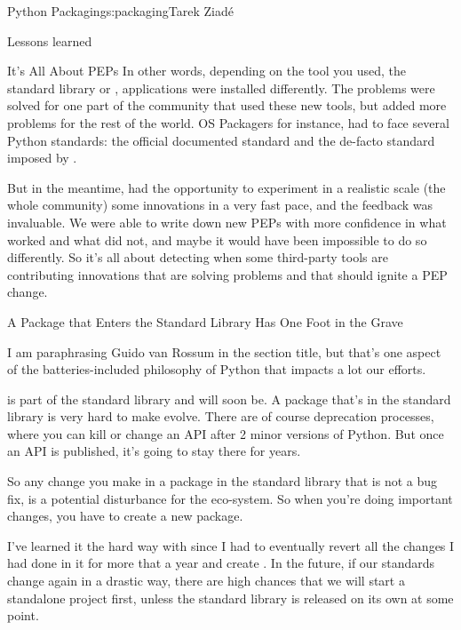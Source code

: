 \begin{aosachapter}{Python Packaging}{s:packaging}{Tarek Ziad\'{e}}
\begin{aosasect1}{Lessons learned}
\begin{aosasect2}{It's All About PEPs}
In other words, depending on the tool you used, the standard library
 or , applications were installed
differently. The problems were solved for one part of the community 
that used these new tools, but added more problems for the rest of 
the world.
OS Packagers for instance, had to face several Python standards:
the official documented standard and the de-facto standard imposed by 
.

But in the meantime,  had the opportunity to experiment
in a realistic scale (the whole community) some innovations in a
very fast pace, and the feedback was invaluable. We were able to 
write down new PEPs with more confidence in what worked and what did not,
and maybe it would have been impossible to do so differently.
So it's all about detecting when some third-party tools are contributing
innovations that are solving problems and that should ignite a PEP
change.

\end{aosasect2}

\begin{aosasect2}{A Package that Enters the Standard Library Has One Foot in the Grave}

I am paraphrasing Guido van Rossum in the section title, but that's
one aspect of the batteries-included philosophy of Python that 
impacts a lot our efforts.

 is part of the standard library and  
will soon be. A package that's in the standard library is very hard to 
make evolve. There are of course deprecation processes, where you can kill 
or change an API after 2 minor versions of Python. But once an API is 
published, it's going to stay there for years.

So any change you make in a package in the standard library that is 
not a bug fix, is a potential disturbance for the eco-system. So when 
you're doing important changes, you have to create a new package.

I've learned it the hard way with  since I had to eventually
revert all the changes I had done in it for more that a year and create
. In the future, if our standards change again in a drastic 
way, there are high chances that we will start a standalone 
project first, unless the standard library is released on its own at some point.

\end{aosasect2}


\end{aosasect1}
\end{aosachapter}
